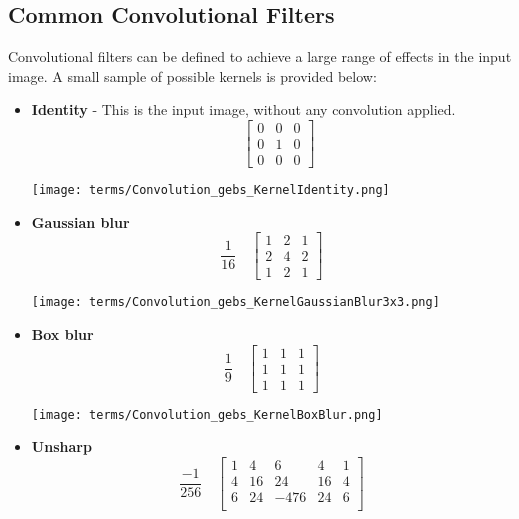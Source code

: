 \subsection{Common Convolutional Filters}
\label{sec:convolution:convolutionalfilters:commonconvolutionalfilters}
Convolutional filters can be defined to achieve a large range of effects in the input image.\newline
A small sample of possible kernels is provided below:\newline
\begin{itemize}
    \item \textbf{Identity} - This is the input image, without any convolution applied.
    $$
    \quad
    \begin{bmatrix} 
    0 & 0 & 0 \\
    0 & 1 & 0 \\
    0 & 0 & 0
    \end{bmatrix}
    $$
    \begin{center}
	\texttt{[image: terms/Convolution\_gebs\_KernelIdentity.png]}
    \end{center}
    \item \textbf{Gaussian blur}
    $$
    \frac{1}{16}
    \quad
    \begin{bmatrix} 
    1 & 2 & 1 \\
    2 & 4 & 2 \\
    1 & 2 & 1
    \end{bmatrix}
    $$
    \begin{center}
	\texttt{[image: terms/Convolution\_gebs\_KernelGaussianBlur3x3.png]}
    \end{center}
    \item \textbf{Box blur}
    $$
    \frac{1}{9}
    \quad
    \begin{bmatrix} 
    1 & 1 & 1 \\
    1 & 1 & 1 \\
    1 & 1 & 1
    \end{bmatrix}
    $$
    \begin{center}
	\texttt{[image: terms/Convolution\_gebs\_KernelBoxBlur.png]}
    \end{center}
    \item \textbf{Unsharp}
    $$
    \frac{-1}{256}
    \quad
    \begin{bmatrix} 
    1 & 4 & 6 & 4 & 1 \\
    4 & 16 & 24 & 16 & 4 \\
    6 & 24 & -476 & 24 & 6 \\

\end{bmatrix}$$
\end{itemize}
